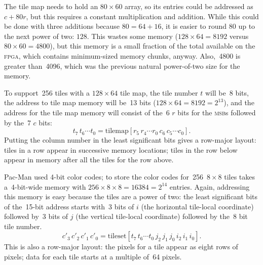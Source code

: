 \documentclass[11pt]{article}
\begin{document}
The tile map needs to hold an $80 \times 60$ array, so its entries
could be addressed as $c + 80r$, but this requires a constant
multiplication and addition.  While this could be done with three
additions because $80 = 64 + 16$, it is easier to round $80$ up to the
next power of two: $128$.  This wastes some memory ($128 \times 64 =
8192$ versus $80 \times 60 = 4800$), but this memory is a small
fraction of the total available on the \textsc{fpga}, which contains
minimum-sized memory chunks, anyway.  Also,~4800 is greater than~4096,
which was the previous natural power-of-two size for the memory.

To support~256 tiles with a $128 \times 64$ tile map, the tile number
$t$ will be~8 bits, the address to tile map memory will be~13 bits
($128 \times 64 = 8192 = 2^{13}$), and the address for the tile map
memory will consist of the~6 $r$ bits for the \textsc{msb}s followed
by the~7 $c$ bits:
%
\begin{equation}
t_7\,t_6\cdots t_0 = \text{tilemap}[r_5\,r_4\cdots r_0\,c_6\,c_5\cdots c_0].
\label{eq:tilemap}
\end{equation}
%
Putting the column number in the least significant bits gives a
row-major layout: tiles in a row appear in successive memory
locations; tiles in the row below appear in memory after all the tiles
for the row above.

Pac-Man used 4-bit color codes; to store the color codes
for~256~$8\times8$ tiles takes a~4-bit-wide memory with $256 \times 8
\times 8 = 16384 = 2^{14}$ entries.  Again, addressing this memory is
easy because the tiles are a power of two: the least significant bits
of the~15-bit address starts with~3 bits of $i$ (the horizontal
tile-local coordinate) followed by~3 bits of $j$ (the vertical
tile-local coordinate) followed by the~8 bit tile number.
%
\begin{equation}
c'_3\,c'_2\,c'_1\,c'_0 = \text{tileset}[t_7\,t_6\cdots t_0\,j_2\,j_1\,j_0\,i_2\,i_1\,i_0].
\label{eq:tileset}
\end{equation}
%
This is also a row-major layout: the pixels for a tile appear as eight
rows of pixels; data for each tile starts at a multiple of~64 pixels.

\clearpage

\newcommand{\datasize}{\fontsize{7}{6}\selectfont}
\end{document}
